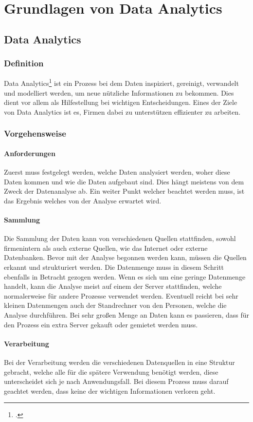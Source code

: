 \chapter{Grundlagen von Data Analytics}
\bauer	
\section{Data Analytics}	
\subsection{Definition}
Data Analytics\footcite{data-analysis} ist ein Prozess bei dem Daten inspiziert, gereinigt, verwandelt und modelliert werden, um neue nützliche Informationen zu bekommen. 
Dies dient vor allem als Hilfestellung bei wichtigen Entscheidungen. Eines der Ziele von Data Analytics ist es, Firmen dabei zu unterstützen effizienter zu arbeiten. 	
\subsection{Vorgehensweise}		
\subsubsection{Anforderungen}
Zuerst muss festgelegt werden, welche Daten analysiert werden, woher diese Daten kommen und wie die Daten aufgebaut sind. 
Dies hängt meistens von dem Zweck der Datenanalyse ab. Ein weiter Punkt welcher beachtet werden muss, ist das Ergebnis welches von der Analyse erwartet wird.		
\subsubsection{Sammlung}
Die Sammlung der Daten kann von verschiedenen Quellen stattfinden, sowohl firmenintern als auch externe Quellen, wie das Internet oder externe Datenbanken. 
Bevor mit der Analyse begonnen werden kann, müssen die Quellen erkannt und strukturiert werden. Die Datenmenge muss in diesem Schritt ebenfalls in Betracht gezogen werden. 
Wenn es sich um eine geringe Datenmenge handelt, kann die Analyse meist auf einem der Server stattfinden, welche normalerweise für andere Prozesse verwendet werden. Eventuell reicht bei sehr kleinen Datenmengen auch der Standrechner von den Personen, welche die Analyse durchführen. 
Bei sehr großen Menge an Daten kann es passieren, dass für den Prozess ein extra Server gekauft oder gemietet werden muss. 			
\subsubsection{Verarbeitung}
Bei der Verarbeitung werden die verschiedenen Datenquellen in eine Struktur gebracht, welche alle für die spätere Verwendung benötigt werden, diese unterscheidet sich je nach Anwendungsfall. 
Bei diesem Prozess muss darauf geachtet werden, dass keine der wichtigen Informationen verloren geht. 		
